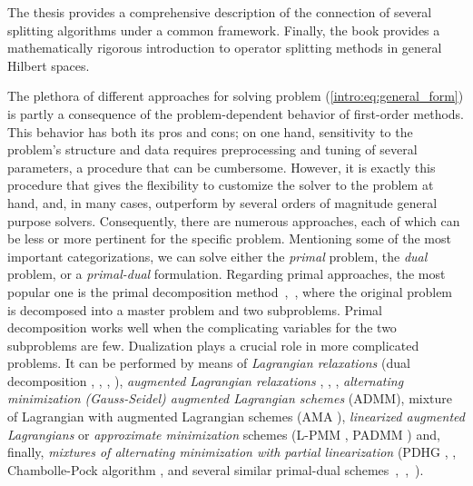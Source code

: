 \documentclass[openany]{now}
\begin{document}
The thesis \cite{esser} provides a comprehensive description of the connection of several splitting algorithms under a common framework. Finally, the book \cite{bauschke2011convex} provides a mathematically rigorous introduction to operator splitting methods in general Hilbert spaces.

The plethora of different approaches for solving problem (\ref{intro:eq:general_form}) is partly a consequence of the problem-dependent behavior of first-order methods. This behavior has both its pros and cons; on one hand, sensitivity to the problem's structure and data requires preprocessing and tuning of several parameters, a procedure that can be cumbersome. However, it is exactly this procedure that gives the flexibility to customize the solver to the problem at hand, and, in many cases, outperform by several orders of magnitude general purpose solvers. Consequently, there are numerous approaches, each of which can be less or more pertinent for the specific problem. Mentioning some of the most important categorizations, we can solve either the \emph{primal} problem, the \emph{dual} problem, or a \emph{primal-dual} formulation. Regarding primal approaches, the most popular one is the primal decomposition method~\cite{Bertsekas_pdc},~\cite{boyd2007notes}, where the original problem is decomposed into a master problem and two subproblems. Primal decomposition works well when the complicating variables for the two subproblems are few. Dualization plays a crucial role in more complicated problems. It can be performed by means of \emph{Lagrangian relaxations} (dual decomposition \cite{Danz_Wolfe}, \cite{Everett_63}, \cite{Shor:1985:MMN:3585}, \cite{Bertsekas_nnp}), \emph{augmented Lagrangian relaxations} \cite{Bertsekas_AL}, \cite{Rockafellar_ppa}, \cite{prox_admm}, \emph{alternating minimization (Gauss-Seidel) augmented Lagrangian schemes} (ADMM), mixture of Lagrangian with augmented Lagrangian schemes (AMA \cite{ama}), \emph{linearized augmented Lagrangians} or \emph{approximate minimization} schemes (L-PMM \cite{Teboulle_L-PMM}, PADMM \cite{Attouch_padmm}) and, finally, \emph{mixtures of alternating minimization with partial linearization} (PDHG \cite{pdhg}, \cite{Esser:pdhg}, Chambolle-Pock algorithm \cite{chamb}, \cite{condat2011primal} and several similar primal-dual schemes~\cite{combettes2012primal},~\cite{pda_vu},~\cite{bot2013convergence}).
\end{document}
